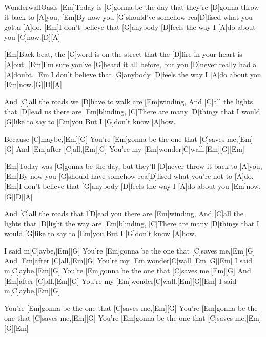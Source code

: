 \documentclass[../main.tex]{subfiles}
\begin{document}
\begin{song}[2]{Wonderwall}{Oasis}{}
[Em]Today is [G]gonna be the day that they're [D]gonna throw it back to [A]you,
[Em]By now you [G]should've somehow rea[D]lised what you gotta [A]do.
[Em]I don't believe that [G]anybody [D]feels the way I [A]do about you [C]now.[D]{\hh}[A]{\hh}

[Em]Back beat, the [G]word is on the street that the [D]fire in your heart is [A]out,
[Em]I'm sure you've [G]heard it all before, but you [D]never really had a [A]doubt.
[Em]I don't believe that [G]anybody [D]feels the way I [A]do about you [Em]now.[G]{\hh}[D]{\hh}[A]{\hh}

And [C]all the roads we [D]have to walk are [Em]winding,
And [C]all the lights that [D]lead us there are [Em]blinding,
[C]There are many [D]things that I would [G]like to say to [Em]you
But I [G]don't know [A]how.

Because [C]maybe,[Em]{\hh}[G]{\hh}
You're [Em]gonna be the one that [C]saves me,[Em]{\hh}[G]{\hh}
And [Em]after [C]all,[Em]{\hh}[G]{\hh}
You're my [Em]wonder[C]wall.[Em]{\hh}[G]{\hh}[Em]{\hh}

[Em]Today was [G]gonna be the day, but they'll [D]never throw it back to [A]you,
[Em]By now you [G]should have somehow rea[D]lised what you're not to [A]do.
[Em]I don't believe that [G]anybody [D]feels the way I [A]do about you [Em]now.[G]{\hh}[D]{\hh}[A]{\hh}

And [C]all the roads that l[D]ead you there are [Em]winding,
And [C]all the lights that [D]light the way are [Em]blinding,
[C]There are many [D]things that I would [G]like to say to [Em]you
But I [G]don't know [A]how.

I said m[C]aybe,[Em]{\hh}[G]{\hh}
You're [Em]gonna be the one that [C]saves me,[Em]{\hh}[G]{\hh}
And [Em]after [C]all,[Em]{\hh}[G]{\hh}
You're my [Em]wonder[C]wall.[Em]{\hh}[G]{\hh}[Em]{\hh}
I said m[C]aybe,[Em]{\hh}[G]{\hh}
You're [Em]gonna be the one that [C]saves me,[Em]{\hh}[G]{\hh}
And [Em]after [C]all,[Em]{\hh}[G]{\hh}
You're my [Em]wonder[C]wall.[Em]{\hh}[G]{\hh}[Em]{\hh}
I said m[C]aybe,[Em]{\hh}[G]{\hh}

You're [Em]gonna be the one that [C]saves me,[Em]{\hh}[G]{\hh}
You're [Em]gonna be the one that [C]saves me,[Em]{\hh}[G]{\hh}
You're [Em]gonna be the one that [C]saves me,[Em]{\hh}[G]{\hh}[Em]{\hh}

\end{song}
\end{document}
